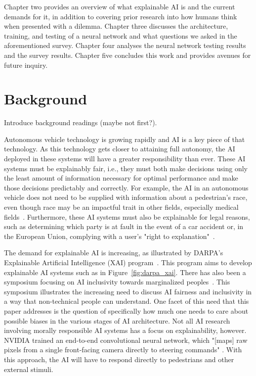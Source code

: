 \documentclass[paper=a4paper]{report}
\begin{document}
Chapter two provides an overview of what explainable AI is and the current demands for it, in
addition to covering prior research into how humans think when presented with a dilemma. Chapter
three discusses the architecture, training, and testing of a neural network and what questions we
asked in the aforementioned survey. Chapter four analyses the neural network testing results and the
survey results. Chapter five concludes this work and provides avenues for future inquiry.


\FloatBarrier
\chapter{Background}

Introduce background readings (maybe not first?).

Autonomous vehicle technology is growing rapidly and AI is a key piece of that technology. As this
technology gets closer to attaining full autonomy, the AI deployed in these systems will have a
greater responsibility than ever. These AI systems must be explainably fair, i.e., they must both
make decisions using only the least amount of information necessary for optimal performance and make
those decisions predictably and correctly. For example, the AI in an autonomous vehicle does not
need to be supplied with information about a pedestrian's race, even though race may be an impactful
trait in other fields, especially medical fields~\cite{sickeCellDisease}. Furthermore, these AI
systems must also be explainable for legal reasons, such as determining which party is at fault in
the event of a car accident or, in the European Union, complying with a user's "right to
explanation"~\cite{goodman2017european}.

The demand for explainable AI is increasing, as illustrated by DARPA's Explainable Artificial
Intelligence (XAI) program~\cite{gunning2016explainable}. This program aims to develop explainable
AI systems such as in Figure~\ref{fig:darpa_xai}. There has also been a symposium focusing on AI
inclusivity towards marginalized peoples~\cite{berkmanKleinCenterAI2017,aiAndInclusionSymposium}.
This symposium illustrates the increasing need to discuss AI fairness and inclusivity in a way that
non-technical people can understand. One facet of this need that this paper addresses is the
question of specifically how much one needs to care about possible biases in the various stages of
AI architecture. Not all AI research involving morally responsible AI systems has a focus on
explainability, however. NVIDIA trained an end-to-end convolutional neural network, which "[maps]
raw pixels from a single front-facing camera directly to steering commands" \cite{bojarski2016end}.
With this approach, the AI will have to respond directly to pedestrians and other external stimuli.
\end{document}
